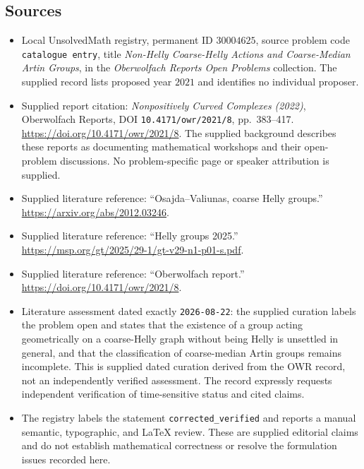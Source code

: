 \documentclass[11pt]{article}
\begin{document}
\subsection{Sources}
\begin{itemize}
\item Local UnsolvedMath registry, permanent ID \(30004625\), source problem code \texttt{catalogue entry}, title \emph{Non-Helly Coarse-Helly Actions and Coarse-Median Artin Groups}, in the \emph{Oberwolfach Reports Open Problems} collection. The supplied record lists proposed year \(2021\) and identifies no individual proposer.
\item Supplied report citation: \emph{Nonpositively Curved Complexes (2022)}, Oberwolfach Reports, DOI \texttt{10.4171/owr/2021/8}, pp.~383--417. \url{https://doi.org/10.4171/owr/2021/8}. The supplied background describes these reports as documenting mathematical workshops and their open-problem discussions. No problem-specific page or speaker attribution is supplied.
\item Supplied literature reference: ``Osajda--Valiunas, coarse Helly groups.'' \url{https://arxiv.org/abs/2012.03246}.
\item Supplied literature reference: ``Helly groups 2025.'' \url{https://msp.org/gt/2025/29-1/gt-v29-n1-p01-s.pdf}.
\item Supplied literature reference: ``Oberwolfach report.'' \url{https://doi.org/10.4171/owr/2021/8}.
\item Literature assessment dated exactly \texttt{2026-08-22}: the supplied curation labels the problem open and states that the existence of a group acting geometrically on a coarse-Helly graph without being Helly is unsettled in general, and that the classification of coarse-median Artin groups remains incomplete. This is supplied dated curation derived from the OWR record, not an independently verified assessment. The record expressly requests independent verification of time-sensitive status and cited claims.
\item The registry labels the statement \texttt{corrected\_verified} and reports a manual semantic, typographic, and LaTeX review. These are supplied editorial claims and do not establish mathematical correctness or resolve the formulation issues recorded here.
\end{itemize}
\end{document}
